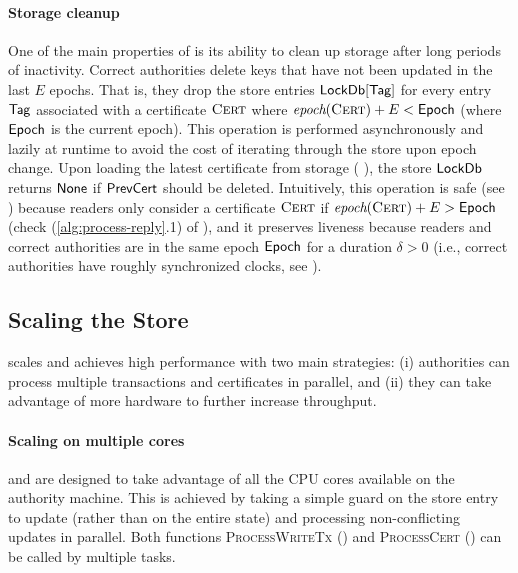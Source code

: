 \paragraph{Storage cleanup}
One of the main properties of \sysname is its ability to clean up storage after long periods of inactivity. Correct authorities delete keys that have not been updated in the last $E$ epochs. That is, they drop the store entries $\textsf{LockDb}[\textsf{Tag}]$ for every entry $\textsf{Tag}$ associated with a certificate $\textsc{Cert}$ where $\emph{epoch}(\textsc{Cert}) + E < \textsf{Epoch}$ (where $\textsf{Epoch}$ is the current epoch).
%
This operation is performed asynchronously and lazily at runtime to avoid the cost of iterating through the store upon epoch change. Upon loading the latest certificate from storage ( ), the store $\textsf{LockDb}$ returns $\textsf{None}$ if $\textsf{PrevCert}$ should be deleted.
%
Intuitively, this operation is safe (see ) because readers only consider a certificate $\textsc{Cert}$ if $\emph{epoch}(\textsc{Cert}) + E > \textsf{Epoch}$ (check (\ref{alg:process-reply}.1) of ), and it preserves liveness because readers and correct authorities are in the same epoch $\textsf{Epoch}$ for a duration $\delta > 0$ (i.e., correct authorities have roughly synchronized clocks, see ).



\subsection{Scaling the \sysname Store}
\sysname scales and achieves high performance with two main strategies: (i) authorities can process multiple transactions and certificates in parallel, and (ii) they can take advantage of more hardware to further increase throughput.

\paragraph{Scaling on multiple cores}
 and  are designed to take advantage of all the CPU cores available on the authority machine. This is achieved by taking a simple guard on the store entry to update (rather than on the entire state) and processing non-conflicting updates in parallel. Both functions \textsc{ProcessWriteTx} () and \textsc{ProcessCert} () can be called by multiple tasks.

